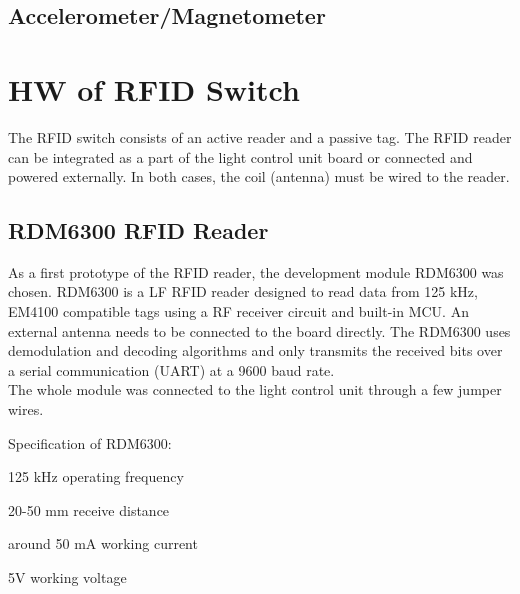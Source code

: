     \subsection{Accelerometer/Magnetometer}


\section{HW of RFID Switch}
    \label{sec:hw_rfid_switch}
     The RFID switch consists of an active reader and a passive tag. The RFID reader can be integrated as a part of the light control unit board or connected and powered externally. In both cases, the coil (antenna) must be wired to the reader. 
    
    \subsection{RDM6300 RFID Reader}
        \label{sec:hw_rfid_rdm6300}
        As a first prototype of the RFID reader, the development module RDM6300 was chosen. RDM6300 is a LF RFID reader designed to read data from 125 kHz, EM4100 compatible tags using a RF receiver circuit and built-in MCU. An external antenna needs to be connected to the board directly.
        The RDM6300 uses demodulation and decoding algorithms and only transmits the received bits over a serial communication (UART) at a 9600 baud rate.\\
        The whole module was connected to the light control unit through a few jumper wires.
        
        
        \begin{titleitemize}{Specification of RDM6300:}
            \item 125 kHz operating frequency 
            \item 20-50 mm receive distance
            \item around 50 mA working current
            \item 5V working voltage
        \end{titleitemize}
            
